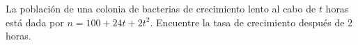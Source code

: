 \item La población de una colonia de bacterias de crecimiento lento al cabo de $t$ horas está dada por $n = 100 + 24t + 2t^2$. Encuentre la tasa de crecimiento después de 2 horas.
